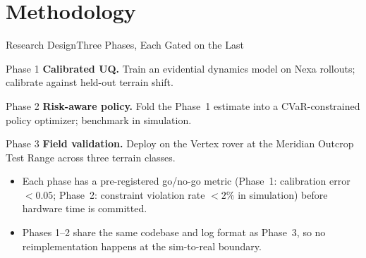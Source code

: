 \section{Methodology}

\begin{frame}{Research Design}{Three Phases, Each Gated on the Last}
  \begin{minipage}[t]{0.32\textwidth}
    \begin{navybox}{Phase 1}
      \footnotesize
      \textbf{Calibrated UQ.} Train an evidential dynamics model on Nexa
      rollouts; calibrate against held-out terrain shift.
    \end{navybox}
  \end{minipage}\hfill
  \begin{minipage}[t]{0.32\textwidth}
    \begin{navybox}{Phase 2}
      \footnotesize
      \textbf{Risk-aware policy.} Fold the Phase~1 estimate into a
      CVaR-constrained policy optimizer; benchmark in simulation.
    \end{navybox}
  \end{minipage}\hfill
  \begin{minipage}[t]{0.32\textwidth}
    \begin{navybox}{Phase 3}
      \footnotesize
      \textbf{Field validation.} Deploy on the Vertex rover at the Meridian
      Outcrop Test Range across three terrain classes.
    \end{navybox}
  \end{minipage}
  \par\vspace{10pt}

  \begin{itemize}
    \item Each phase has a pre-registered go/no-go metric (Phase~1:
      calibration error $< 0.05$; Phase~2: constraint violation rate
      $<2\%$ in simulation) before hardware time is committed.
    \item Phases 1--2 share the same codebase and log format as Phase~3, so
      no reimplementation happens at the sim-to-real boundary.
  \end{itemize}
\end{frame}

